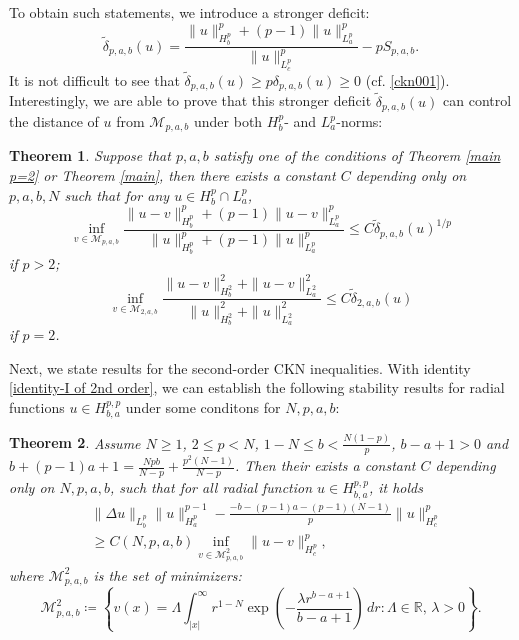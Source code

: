 \documentclass[11pt]{article}
\newtheorem{theorem}{Theorem}[section]
\newcommand{\R}{\mathbb{R}}
\numberwithin{equation}{section}
\begin{document}
\vskip0.3in
To obtain such statements, we introduce a stronger deficit:
\begin{equation}\label{ckn003}\tilde{\delta}_{p,a,b}(u) = \frac{\|u\|_{H^p_b}^p + (p-1) \|u\|_{L^p_a}^p}{\|u\|_{L_c^p}^p} - pS_{p,a,b}.\end{equation}
It is not difficult to see that $\tilde{\delta}_{p,a,b}(u)\ge p\delta_{p,a,b}(u)\ge 0$ (cf. \eqref{ckn001}).
Interestingly,  we  are able to prove that this  stronger deficit $\tilde{\delta}_{p,a,b}(u)$ can control the distance of $u$ from $\mathcal{M}_{p,a,b}$ under both $H^p_b$- and $L^p_a$-norms:
\begin{theorem}\label{plus version}
    Suppose that $p,a,b$ satisfy one of the conditions of Theorem \ref{main p=2} or Theorem \ref{main}, then there exists a constant $C$ depending only on $p,a,b,N$ such that for any $u\in H^p_b \cap L^p_a$,
    \begin{equation}\label{sum 1}
        \inf_{v\in \mathcal{M}_{p,a,b}}\frac{\|u-v\|_{H_b^p}^p + (p-1)\|u-v\|_{L^p_a}^p}{\|u\|_{H^p_b}^p + (p-1)\|u\|_{L^p_a}^p} \le C\tilde{\delta}_{p,a,b}(u)^{1/p}
    \end{equation}
    if $p>2$;
    \begin{equation}\label{sum 2}
        \inf_{v\in \mathcal{M}_{2,a,b}}\frac{\|u-v\|_{H_b^2}^2 + \|u-v\|_{L^2_a}^2}{\|u\|_{H^2_b}^2 + \|u\|_{L^2_a}^2} \le C\tilde{\delta}_{2,a,b}(u)
    \end{equation}
    if $p=2$.
\end{theorem}

Next, we state results for the second-order CKN inequalities. With identity \eqref{identity-I of 2nd order}, we can establish the following stability results for radial functions $u\in H_{b,a}^{p,p}$ under some conditons for $N,p,a,b$:
\begin{theorem}\label{main I - 2nd order}
    Assume $N\ge 1$, $2\le p<N$, $1-N\le b<\frac{N(1-p)}{p}$, $b-a+1>0$ and $b+(p-1)a+1 = \frac{Npb}{N-p}+\frac{p^2(N-1)}{N-p}$. Then their exists a constant $C$ depending only on $N,p,a,b$, such that for all radial function $u\in H_{b,a}^{p,p}$, it holds
    \begin{equation}\label{2nd weak inequalities}
        \begin{aligned}
            &\|\Delta u\|_{L_b^p}\|u\|_{H_a^p}^{p-1} - \frac{-b-(p-1)a-(p-1)(N-1)}{p}\|u\|_{H_c^p}^p\\
             & \ge{} C(N,p,a,b) \inf_{v\in\mathcal{M}_{p,a,b}^2} \|u-v\|_{H_c^p}^p,
        \end{aligned}
    \end{equation}
    where $\mathcal{M}_{p,a,b}^2$ is the set of minimizers:
    \[ \mathcal{M}_{p,a,b}^2 \coloneqq \left\{v(x) = \Lambda \int_{|x|}^\infty r^{1-N}\exp\left(-\frac{\lambda r^{b-a+1}}{b-a+1}\right)\,dr:\Lambda\in\R,\, \lambda>0\right\}.\]
\end{theorem}
\end{document}
